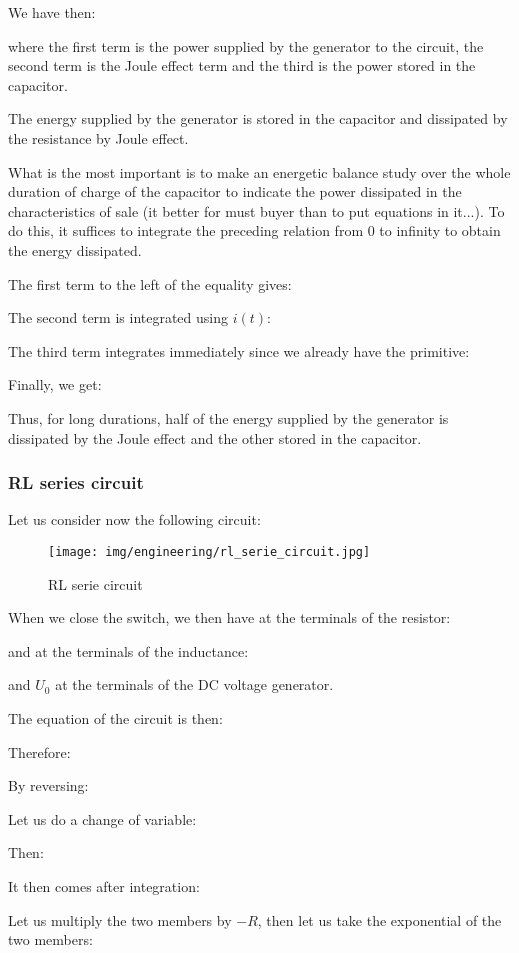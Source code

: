 	We have then:
	
	where the first term is the power supplied by the generator to the circuit, the second term is the Joule effect term and the third is the power stored in the capacitor.

	The energy supplied by the generator is stored in the capacitor and dissipated by the resistance by Joule effect.

	What is the most important is to make an energetic balance study over the whole duration of charge of the capacitor to indicate the power dissipated in the characteristics of sale (it better for must buyer than to put equations in it...). To do this, it suffices to integrate the preceding relation from $0$ to infinity to obtain the energy dissipated.

	The first term to the left of the equality gives:
	
	The second term is integrated using $i(t)$:
	
	The third term integrates immediately since we already have the primitive:
	
	Finally, we get:
	
	Thus, for long durations, half of the energy supplied by the generator is dissipated by the Joule effect and the other stored in the capacitor.
	
	
	\subsubsection{RL series circuit}
	Let us consider now the following circuit:
	\begin{figure}[H]
		\centering
		\texttt{[image: img/engineering/rl\_serie\_circuit.jpg]}
		\caption{RL serie circuit}
	\end{figure}
	When we close the switch, we then have at the terminals of the resistor:
	
	and at the terminals of the inductance:
	
	and $U_0$ at the terminals of the DC voltage generator.
	
	The equation of the circuit is then:
	
	Therefore:
	
	By reversing:
	
	Let us do a change of variable:
	
	Then:
	
	It then comes after integration:
	
	Let us multiply the two members by $-R$, then let us take the exponential of the two members:
	

